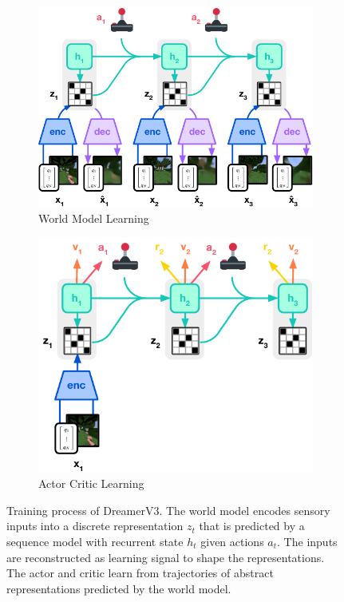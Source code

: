 \begin{figure}[t]
\centering
\begin{subfigure}{.5\textwidth}
\includegraphics[width=\linewidth]{model/model_wm}
\caption{World Model Learning}
\end{subfigure}\hfill%
\begin{subfigure}{.43\textwidth}
\includegraphics[width=\linewidth]{model/model_ac}
\caption{Actor Critic Learning}
\end{subfigure}
\caption{Training process of DreamerV3. The world model encodes sensory inputs into a discrete representation $z_t$ that is predicted by a sequence model with recurrent state $h_t$ given actions $a_t$. The inputs are reconstructed as learning signal to shape the representations. The actor and critic learn from trajectories of abstract representations predicted by the world model.}
\label{fig:model}
\end{figure}